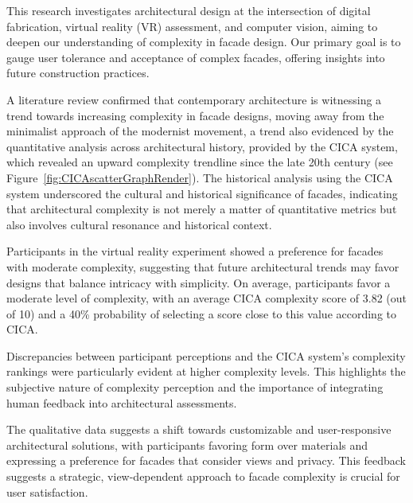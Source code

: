 


This research investigates architectural design at the intersection of digital fabrication, virtual reality (VR) assessment, and computer vision, aiming to deepen our understanding of complexity in facade design.
Our primary goal is to gauge user tolerance and acceptance of complex facades, offering insights into future construction practices.

A literature review confirmed that contemporary architecture is witnessing a trend towards increasing complexity in facade designs, moving away from the minimalist approach of the modernist movement, a trend also evidenced by the quantitative analysis across architectural history, provided by the CICA system, which revealed an upward complexity trendline since the late 20th century (see Figure~\ref{fig:CICAscatterGraphRender}).
The historical analysis using the CICA system underscored the cultural and historical significance of facades, indicating that architectural complexity is not merely a matter of quantitative metrics but also involves cultural resonance and historical context.

Participants in the virtual reality experiment showed a preference for facades with moderate complexity, suggesting that future architectural trends may favor designs that balance intricacy with simplicity.
On average, participants favor a moderate level of complexity, with an average CICA complexity score of 3.82 (out of 10) and a 40\% probability of selecting a score close to this value according to CICA\@.

Discrepancies between participant perceptions and the CICA system's complexity rankings were particularly evident at higher complexity levels.
This highlights the subjective nature of complexity perception and the importance of integrating human feedback into architectural assessments.

The qualitative data suggests a shift towards customizable and user-responsive architectural solutions, with participants favoring form over materials and expressing a preference for facades that consider views and privacy.
This feedback suggests a strategic, view-dependent approach to facade complexity is crucial for user satisfaction.

